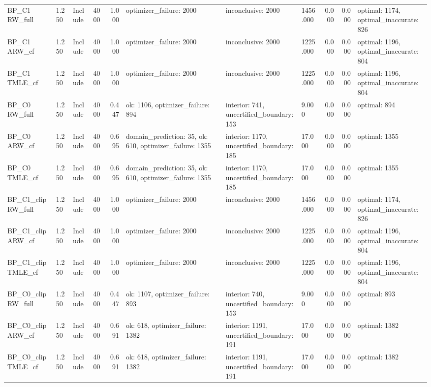 \begin{tabular}{llllrlllrrl}
BP\_C1 RW\_full & 1.250 & Include & 4000 & 1.000 & optimizer\_failure: 2000 & inconclusive: 2000 & 1456.000 & 0.000 & 0.000 & optimal: 1174, optimal\_inaccurate: 826 \\
BP\_C1 ARW\_cf & 1.250 & Include & 4000 & 1.000 & optimizer\_failure: 2000 & inconclusive: 2000 & 1225.000 & 0.000 & 0.000 & optimal: 1196, optimal\_inaccurate: 804 \\
BP\_C1 TMLE\_cf & 1.250 & Include & 4000 & 1.000 & optimizer\_failure: 2000 & inconclusive: 2000 & 1225.000 & 0.000 & 0.000 & optimal: 1196, optimal\_inaccurate: 804 \\
BP\_C0 RW\_full & 1.250 & Include & 4000 & 0.447 & ok: 1106, optimizer\_failure: 894 & interior: 741, uncertified\_boundary: 153 & 9.000 & 0.000 & 0.000 & optimal: 894 \\
BP\_C0 ARW\_cf & 1.250 & Include & 4000 & 0.695 & domain\_prediction: 35, ok: 610, optimizer\_failure: 1355 & interior: 1170, uncertified\_boundary: 185 & 17.000 & 0.000 & 0.000 & optimal: 1355 \\
BP\_C0 TMLE\_cf & 1.250 & Include & 4000 & 0.695 & domain\_prediction: 35, ok: 610, optimizer\_failure: 1355 & interior: 1170, uncertified\_boundary: 185 & 17.000 & 0.000 & 0.000 & optimal: 1355 \\
BP\_C1\_clip RW\_full & 1.250 & Include & 4000 & 1.000 & optimizer\_failure: 2000 & inconclusive: 2000 & 1456.000 & 0.000 & 0.000 & optimal: 1174, optimal\_inaccurate: 826 \\
BP\_C1\_clip ARW\_cf & 1.250 & Include & 4000 & 1.000 & optimizer\_failure: 2000 & inconclusive: 2000 & 1225.000 & 0.000 & 0.000 & optimal: 1196, optimal\_inaccurate: 804 \\
BP\_C1\_clip TMLE\_cf & 1.250 & Include & 4000 & 1.000 & optimizer\_failure: 2000 & inconclusive: 2000 & 1225.000 & 0.000 & 0.000 & optimal: 1196, optimal\_inaccurate: 804 \\
BP\_C0\_clip RW\_full & 1.250 & Include & 4000 & 0.447 & ok: 1107, optimizer\_failure: 893 & interior: 740, uncertified\_boundary: 153 & 9.000 & 0.000 & 0.000 & optimal: 893 \\
BP\_C0\_clip ARW\_cf & 1.250 & Include & 4000 & 0.691 & ok: 618, optimizer\_failure: 1382 & interior: 1191, uncertified\_boundary: 191 & 17.000 & 0.000 & 0.000 & optimal: 1382 \\
BP\_C0\_clip TMLE\_cf & 1.250 & Include & 4000 & 0.691 & ok: 618, optimizer\_failure: 1382 & interior: 1191, uncertified\_boundary: 191 & 17.000 & 0.000 & 0.000 & optimal: 1382 \\

\end{tabular}
